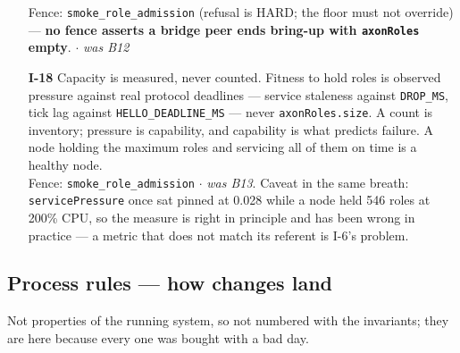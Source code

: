 \documentclass[nobib]{tufte-handout}
\begin{document}
\begin{enumerate}
  {\footnotesize\textsf{Fence:} \texttt{smoke\_role\_admission} (refusal
  is HARD; the floor must not override) --- \textbf{no fence asserts a
  bridge peer ends bring-up with \texttt{axonRoles} empty}. $\cdot$
  \emph{was B12}}
\item[\textbf{I-18}] Capacity is measured, never counted. Fitness to
  hold roles is observed pressure against real protocol deadlines ---
  service staleness against \texttt{DROP\_MS}, tick lag against
  \texttt{HELLO\_DEADLINE\_MS} --- never \texttt{axonRoles.size}. A
  count is inventory; pressure is capability, and capability is what
  predicts failure. A node holding the maximum roles and servicing all
  of them on time is a healthy node.\\
  {\footnotesize\textsf{Fence:} \texttt{smoke\_role\_admission} $\cdot$
  \emph{was B13}. Caveat in the same breath: \texttt{servicePressure}
  once sat pinned at 0.028 while a node held 546 roles at 200\% CPU, so
  the measure is right in principle and has been wrong in practice ---
  a metric that does not match its referent is I-6's problem.}
\end{enumerate}
\endgroup

\subsection{Process rules --- how changes land}

Not properties of the running system, so not numbered with the
invariants; they are here because every one was bought with a bad day.
\end{document}
